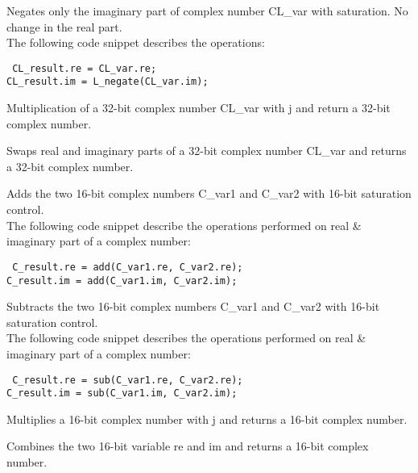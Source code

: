 Negates only the imaginary part of complex number CL\_var with saturation.
No change in the real part.\\
The following code snippet describes the operations:

{\tt {} CL\_result.re = CL\_var.re;\\
 CL\_result.im = L\_negate(CL\_var.im);
}


Multiplication of a 32-bit complex number CL\_var with j and return a 32-bit complex number.


Swaps real and imaginary parts of a 32-bit complex number CL\_var and returns a 32-bit complex number.


Adds the two 16-bit complex numbers C\_var1 and C\_var2 with 16-bit saturation control.\\
The following code snippet describe the operations performed on real \& imaginary part of a complex number:

{\tt {} C\_result.re = add(C\_var1.re, C\_var2.re);\\
 C\_result.im = add(C\_var1.im, C\_var2.im);
}


Subtracts the two 16-bit complex numbers C\_var1 and C\_var2 with 16-bit saturation control.\\
The following code snippet describes the operations performed on real \& imaginary part of a complex number:

{\tt {} C\_result.re = sub(C\_var1.re, C\_var2.re);\\
 C\_result.im = sub(C\_var1.im, C\_var2.im);
}


Multiplies a 16-bit complex number with j and returns a 16-bit complex number.


Combines the two 16-bit variable re and im and returns a 16-bit complex number.

